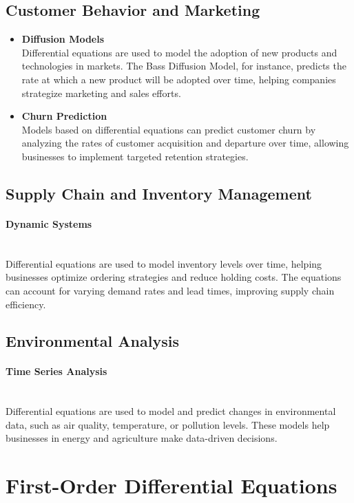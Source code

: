 \documentclass[]{article}
\begin{document}
	\subsection{Customer Behavior and Marketing}
	\begin{itemize}
		\item \textbf{Diffusion Models}\noindent\\
		Differential equations are used to model the adoption of new products and technologies in markets.
		The Bass Diffusion Model, for instance, predicts the rate at which a new product will be adopted over time, helping companies strategize marketing and sales efforts.
		\item \textbf{Churn Prediction}\noindent\\
		Models based on differential equations can predict customer churn by analyzing the rates of customer acquisition and departure over time, allowing businesses to implement targeted retention strategies.
	\end{itemize}
	\subsection{Supply Chain and Inventory Management}
	\paragraph{Dynamic Systems}\noindent\\
	Differential equations are used to model inventory levels over time, helping businesses optimize ordering strategies and reduce holding costs.
	The equations can account for varying demand rates and lead times, improving supply chain efficiency.
	\subsection{Environmental Analysis}
	\paragraph{Time Series Analysis}\noindent\\
	Differential equations are used to model and predict changes in environmental data, such as air quality, temperature, or pollution levels.
	These models help businesses in energy and agriculture make data-driven decisions.
	
	
	
	\section{First-Order Differential Equations}
	
\end{document}
